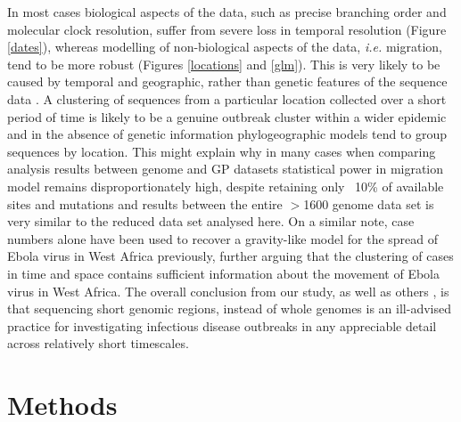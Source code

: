 \documentclass{bmcart}
\begin{document}
In most cases biological aspects of the data, such as precise branching order and molecular clock resolution, suffer from severe loss in temporal resolution (Figure \ref{dates}), whereas modelling of non-biological aspects of the data, \textit{i.e.} migration, tend to be more robust (Figures \ref{locations} and \ref{glm}).
This is very likely to be caused by temporal and geographic, rather than genetic features of the sequence data \cite{boskova_influence_2018}.
A clustering of sequences from a particular location collected over a short period of time is likely to be a genuine outbreak cluster within a wider epidemic and in the absence of genetic information phylogeographic models tend to group sequences by location.
This might explain why in many cases when comparing analysis results between genome and GP datasets statistical power in migration model remains disproportionately high, despite retaining only ~10\% of available sites and mutations and results between the entire $>$1600 genome data set \cite{dudas_virus_2017} is very similar to the reduced data set analysed here.
On a similar note, case numbers alone have been used to recover a gravity-like model for the spread of Ebola virus in West Africa \cite{kramer_spatial_2016} previously, further arguing that the clustering of cases in time and space contains sufficient information about the movement of Ebola virus in West Africa.
The overall conclusion from our study, as well as others \cite{wohl_co-circulating_2018}, is that sequencing short genomic regions, instead of whole genomes is an ill-advised practice for investigating infectious disease outbreaks in any appreciable detail across relatively short timescales.

\section*{Methods}
\end{document}
